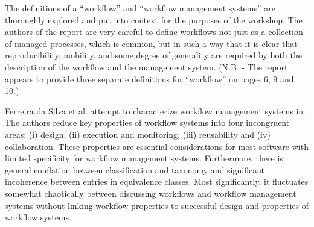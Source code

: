 The definitions of a ``workflow'' and ``workflow management systems'' are
thoroughly explored and put into context for the purposes of the workshop. The
authors of the report are very careful to define workflows not just as a
collection of managed processes, which is common, but in such a way that it is
clear that reproducibility, mobility, and some degree of generality are required
by both the description of the workflow and the management system. (N.B. - The
report appears to provide three separate definitions for ``workflow'' on pages
6, 9 and 10.)

Ferreira da Silva et al. attempt to characterize workflow management systems in
\cite{ferreira_da_silva_characterization_nodate}. The authors reduce key
properties of workflow systems into four incongruent areas: (i) design, (ii)
execution and monitoring, (iii) reusability and (iv) collaboration. These
properties are essential considerations for most  software with limited
specificity for workflow management systems. Furthermore, there is general
conflation between classification and taxonomy and significant incoherence
between entries in equivalence classes. Most significantly, it fluctuates
somewhat chaotically between discussing workflows and workflow management
systems without linking workflow properties to successful design and properties
of workflow systems.
